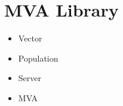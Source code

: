 % 
% 
\chapter{MVA Library}

\begin{iftex}
\begin{itemize}
\item Vector
\item Population
\item Server
\item MVA
\end{itemize}
\end{iftex}





